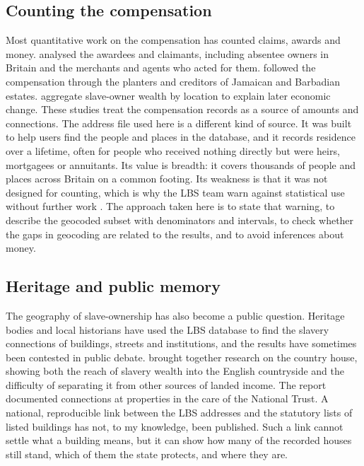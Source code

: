 \documentclass[11pt,a4paper]{article}
\begin{document}
\subsection{Counting the compensation}
Most quantitative work on the compensation has counted claims, awards and money. \citet{draper2010} analysed the awardees and claimants, including absentee owners in Britain and the merchants and agents who acted for them. \citet{butler1995} followed the compensation through the planters and creditors of Jamaican and Barbadian estates. \citet{heblich2022} aggregate slave-owner wealth by location to explain later economic change. These studies treat the compensation records as a source of amounts and connections. The address file used here is a different kind of source. It was built to help users find the people and places in the database, and it records residence over a lifetime, often for people who received nothing directly but were heirs, mortgagees or annuitants. Its value is breadth: it covers thousands of people and places across Britain on a common footing. Its weakness is that it was not designed for counting, which is why the LBS team warn against statistical use without further work \citep{lbs2026maps}. The approach taken here is to state that warning, to describe the geocoded subset with denominators and intervals, to check whether the gaps in geocoding are related to the results, and to avoid inferences about money.

\subsection{Heritage and public memory}
The geography of slave-ownership has also become a public question. Heritage bodies and local historians have used the LBS database to find the slavery connections of buildings, streets and institutions, and the results have sometimes been contested in public debate. \citet{dresser2013} brought together research on the country house, showing both the reach of slavery wealth into the English countryside and the difficulty of separating it from other sources of landed income. The \citet{huxtable2020} report documented connections at properties in the care of the National Trust. A national, reproducible link between the LBS addresses and the statutory lists of listed buildings has not, to my knowledge, been published. Such a link cannot settle what a building means, but it can show how many of the recorded houses still stand, which of them the state protects, and where they are.
\end{document}
